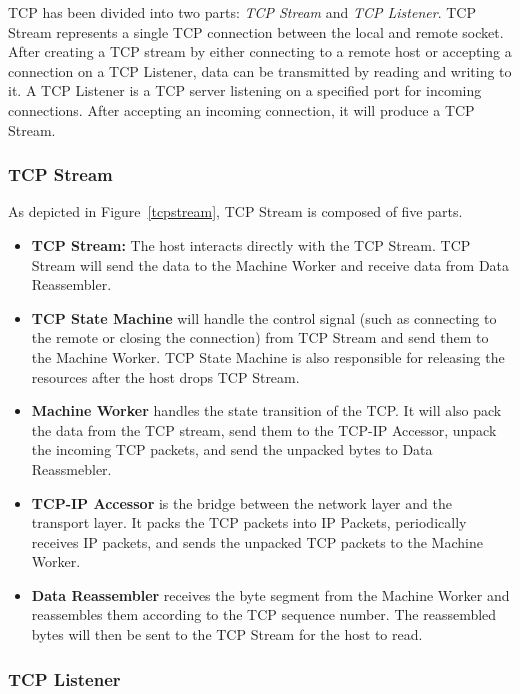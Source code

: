 TCP has been divided into two parts: \emph{TCP Stream} and \emph{TCP Listener}. TCP Stream represents a single TCP connection between the local and remote socket. After creating a TCP stream by either connecting to a remote host or accepting a connection on a TCP Listener, data can be transmitted by reading and writing to it. A TCP Listener is a TCP server listening on a specified port for incoming connections. After accepting an incoming connection, it will produce a TCP Stream.
\subsubsection{TCP Stream}
As depicted in Figure~\ref{tcpstream}, TCP Stream is composed of five parts.
\begin{itemize}
  \item \textbf{TCP Stream:} The host interacts directly with the TCP Stream. TCP Stream will send the data to the Machine Worker and receive data from Data Reassembler.
  \item \textbf{TCP State Machine} will handle the control signal (such as connecting to the remote or closing the connection) from TCP Stream and send them to the Machine Worker. TCP State Machine is also responsible for releasing the resources after the host drops TCP Stream.
  \item \textbf{Machine Worker} handles the state transition of the TCP. It will also pack the data from the TCP stream, send them to the TCP-IP Accessor, unpack the incoming TCP packets, and send the unpacked bytes to Data Reassmebler.
  \item \textbf{TCP-IP Accessor} is the bridge between the network layer and the transport layer. It packs the TCP packets into IP Packets, periodically receives IP packets, and sends the unpacked TCP packets to the Machine Worker.
  \item \textbf{ Data Reassembler} receives the byte segment from the Machine Worker and reassembles them according to the TCP sequence number. The reassembled bytes will then be sent to the TCP Stream for the host to read.
\end{itemize}
\subsubsection{TCP Listener}


